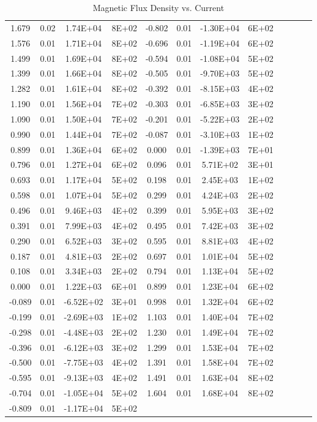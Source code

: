 \begin{enumerate}[resume]
\begin{table}
\begin{tabular}{|c|c|c|c|c|c|c|c|c|c|c|c|}
      1.679&0.02&1.74E+04&8E+02&-0.802&0.01&-1.30E+04&6E+02\\
      1.576&0.01&1.71E+04&8E+02&-0.696&0.01&-1.19E+04&6E+02\\
      1.499&0.01&1.69E+04&8E+02&-0.594&0.01&-1.08E+04&5E+02\\
      1.399&0.01&1.66E+04&8E+02&-0.505&0.01&-9.70E+03&5E+02\\
      1.282&0.01&1.61E+04&8E+02&-0.392&0.01&-8.15E+03&4E+02\\
      1.190&0.01&1.56E+04&7E+02&-0.303&0.01&-6.85E+03&3E+02\\
      1.090&0.01&1.50E+04&7E+02&-0.201&0.01&-5.22E+03&2E+02\\
      0.990&0.01&1.44E+04&7E+02&-0.087&0.01&-3.10E+03&1E+02\\
      0.899&0.01&1.36E+04&6E+02&0.000&0.01&-1.39E+03&7E+01\\
      0.796&0.01&1.27E+04&6E+02&0.096&0.01&5.71E+02&3E+01\\
      0.693&0.01&1.17E+04&5E+02&0.198&0.01&2.45E+03&1E+02\\
      0.598&0.01&1.07E+04&5E+02&0.299&0.01&4.24E+03&2E+02\\
      0.496&0.01&9.46E+03&4E+02&0.399&0.01&5.95E+03&3E+02\\
      0.391&0.01&7.99E+03&4E+02&0.495&0.01&7.42E+03&3E+02\\
      0.290&0.01&6.52E+03&3E+02&0.595&0.01&8.81E+03&4E+02\\
      0.187&0.01&4.81E+03&2E+02&0.697&0.01&1.01E+04&5E+02\\
      0.108&0.01&3.34E+03&2E+02&0.794&0.01&1.13E+04&5E+02\\
      0.000&0.01&1.22E+03&6E+01&0.899&0.01&1.23E+04&6E+02\\
      -0.089&0.01&-6.52E+02&3E+01&0.998&0.01&1.32E+04&6E+02\\
      -0.199&0.01&-2.69E+03&1E+02&1.103&0.01&1.40E+04&7E+02\\
      -0.298&0.01&-4.48E+03&2E+02&1.230&0.01&1.49E+04&7E+02\\
      -0.396&0.01&-6.12E+03&3E+02&1.299&0.01&1.53E+04&7E+02\\
      -0.500&0.01&-7.75E+03&4E+02&1.391&0.01&1.58E+04&7E+02\\
      -0.595&0.01&-9.13E+03&4E+02&1.491&0.01&1.63E+04&8E+02\\
      -0.704&0.01&-1.05E+04&5E+02&1.604&0.01&1.68E+04&8E+02\\
      -0.809&0.01&-1.17E+04&5E+02&&&&\\
      \hline
    \end{tabular}
    \label{tbl:HMTable3}
    \caption{Magnetic Flux Density vs. Current}
  \end{table}




\end{enumerate}
